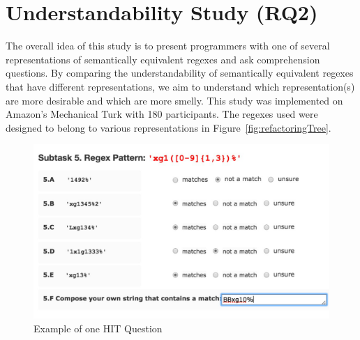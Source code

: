 \section{Understandability Study (RQ2)}
\label{sec:understandability}
The overall idea of this study  is to present  programmers with one of several representations of semantically equivalent regexes and ask comprehension questions. By comparing the understandability of semantically equivalent regexes that have different representations, we aim to understand which representation(s)  are more desirable and which are more smelly.
This study was  implemented on Amazon's Mechanical Turk with 180 participants. The regexes used were designed to belong to various representations in Figure~\ref{fig:refactoringTree}.



\begin{figure}[tb]
\centering
\includegraphics[width=\columnwidth]{illustrations/exampleQuestion}
\vspace{-12pt}
\caption{Example of one HIT Question}
\vspace{-6pt}
\label{fig:exampleQuestion}
\end{figure}



